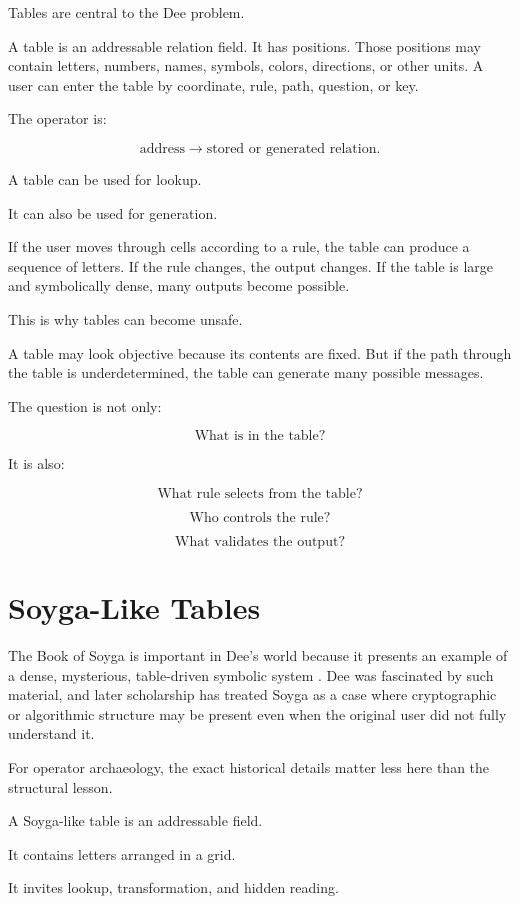 \documentclass[11pt]{book}
\begin{document}
Tables are central to the Dee problem.

A table is an addressable relation field. It has positions. Those positions may contain letters, numbers, names, symbols, colors, directions, or other units. A user can enter the table by coordinate, rule, path, question, or key.

The operator is:

\[
\text{address}
\rightarrow
\text{stored or generated relation}.
\]

A table can be used for lookup.

It can also be used for generation.

If the user moves through cells according to a rule, the table can produce a sequence of letters. If the rule changes, the output changes. If the table is large and symbolically dense, many outputs become possible.

This is why tables can become unsafe.

A table may look objective because its contents are fixed. But if the path through the table is underdetermined, the table can generate many possible messages.

The question is not only:

\[
\text{What is in the table?}
\]

It is also:

\[
\text{What rule selects from the table?}
\]

\[
\text{Who controls the rule?}
\]

\[
\text{What validates the output?}
\]

\section{Soyga-Like Tables}


The Book of Soyga is important in Dee’s world because it presents an example of a dense, mysterious, table-driven symbolic system \cite{Yates1964GiordanoBruno}. Dee was fascinated by such material, and later scholarship has treated Soyga as a case where cryptographic or algorithmic structure may be present even when the original user did not fully understand it.

For operator archaeology, the exact historical details matter less here than the structural lesson.

A Soyga-like table is an addressable field.

It contains letters arranged in a grid.

It invites lookup, transformation, and hidden reading.
\end{document}
